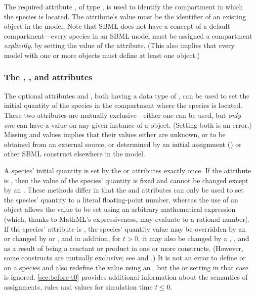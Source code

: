 The required attribute , of type
, is used to identify the compartment in which
the species is located.  The attribute's value must be the
identifier of an existing \Compartment object in the model.  Note
that SBML does not have a concept of a default compartment---every
species in an SBML model must be assigned a compartment
\emph{explicitly}, by setting the value of the 
attribute.  (This also implies that every model with one or more
\Species objects must define at least one \Compartment object.)


\subsubsection{The ,
  , and  attributes}
\label{sec:initialAmount}
\label{sec:species-substanceunits}

The optional attributes  and
, both having a data type of
, can be used to set the initial quantity of the
species in the compartment where the species is located.  These
two attributes are mutually exclusive---either one can be used,
but \emph{only one} can have a value on any given instance of a
\Species object.  (Setting both is an error.)
Missing  and
 values implies that their values
either are unknown, or to be obtained from an external source, or
determined by an initial assignment
() or other SBML construct
elsewhere in the model.

A species' initial quantity is set by the  or
 attributes exactly once.  If the
 attribute is , then the value of the
species' quantity is fixed and cannot be changed except by an
\InitialAssignment.  These methods differ in that the
 and  attributes
can only be used to set the species' quantity to a literal
floating-point number, whereas the use of an \InitialAssignment
object allows the value to be set using an arbitrary mathematical
expression (which, thanks to MathML's expressiveness, may evaluate
to a rational number).  If the species'  attribute
is , the species' quantity value may be overridden by
an \InitialAssignment or changed by \AssignmentRule or
\AlgebraicRule, and in addition, for $t > 0$, it may also be
changed by a \RateRule, \Event, and as a result of being a
reactant or product in one or more \Reaction constructs.  (However, some
constructs are mutually exclusive; see 
and .)  It is not an error to define
 or  on a species
and also redefine the value using an \InitialAssignment, but the
 or  setting in
that case is ignored.  \ref{sec:before-t0} provides
additional information about the semantics of assignments, rules
and values for simulation time $t \leq 0$.

